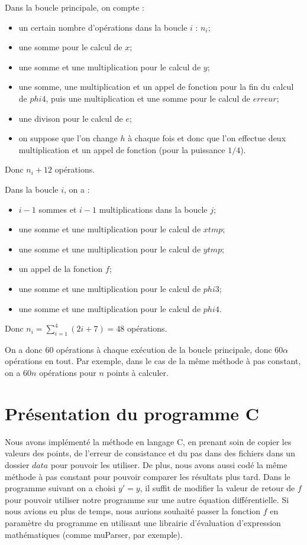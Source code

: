 \documentclass[a4paper, titlepage]{livret} %
\begin{document}
			Dans la boucle principale, on compte :
			\begin{itemize}
				\item un certain nombre d'opérations dans la boucle $i$ : $n_{i}$;
				\item une somme pour le calcul de $x$;
				\item une somme et une multiplication pour le calcul de $y$;
				\item une somme, une multiplication et un appel de fonction pour la fin du calcul de $phi4$, puis une multiplication et une somme pour le calcul de $erreur$;
				\item une divison pour le calcul de $e$;
				\item on suppose que l'on change $h$ à chaque fois et donc que l'on effectue deux multiplication et un appel de fonction (pour la puissance $1/4$).
			\end{itemize}
			Donc $n_{i} + 12$ opérations.

			Dans la boucle $i$, on a :
			\begin{itemize}
				\item $i-1$ sommes et $i-1$ multiplications dans la boucle $j$;
				\item une somme et une multiplication pour le calcul de $xtmp$;
				\item une somme et une multiplication pour le calcul de $ytmp$;
				\item un appel de la fonction $f$;
				\item une somme et une multiplication pour le calcul de $phi3$;
				\item une somme et une multiplication pour le calcul de $phi4$.
			\end{itemize}
			Donc $n_{i} = \sum_{i = 1}^{4} (2i + 7) = 48$ opérations.

			On a donc $60$ opérations à chaque exécution de la boucle principale, donc $60 \alpha$ opérations en tout.
			Par exemple, dans le cas de la même méthode à pas constant, on a $60n$ opérations pour $n$ points à calculer.

		\section{Présentation du programme C}
			Nous avons implémenté la méthode en langage C, en prenant soin de copier les valeurs des points, de l'erreur de consistance et du pas dans des fichiers dans un dossier $data$ pour pouvoir les utiliser.
			De plus, nous avons aussi codé la même méthode à pas constant pour pouvoir comparer les résultats plus tard.
			Dans le programme suivant on a choisi $y' = y$, il suffit de modifier la valeur de retour de $f$ pour pouvoir utiliser notre programme sur une autre équation différentielle.
			Si nous avions eu plus de temps, nous aurions souhaité passer la fonction $f$ en paramètre du programme en utilisant une librairie d'évaluation d'expression mathématiques (comme muParser, par exemple).
			
\end{document}
